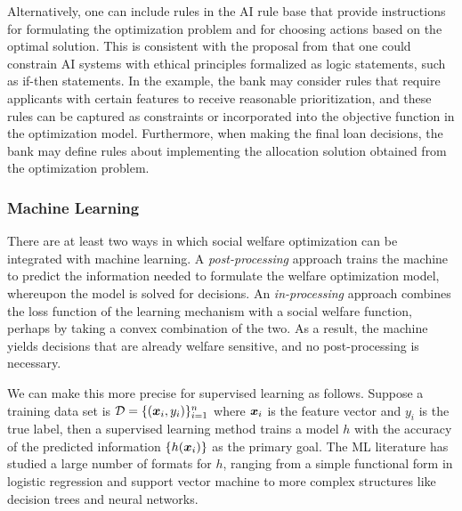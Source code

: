 \documentclass{article}[11pt]
\begin{document}
Alternatively, one can include rules in the AI rule base that provide instructions for formulating the optimization problem and for choosing actions based on the optimal solution. This is consistent with the proposal from \cite{BriArkBel06} that one could constrain AI systems with ethical principles formalized as logic statements, such as if-then statements. In the example, the bank may consider rules that require applicants with certain features to receive reasonable prioritization, and these rules can be captured as constraints or incorporated into the objective function in the optimization model. Furthermore, when making the final loan decisions, the bank may define rules about implementing the allocation solution obtained from the optimization problem. 





\subsubsection*{Machine Learning}
There are at least two ways in which social welfare optimization can be integrated with machine learning.  A \textit{post-processing} approach trains the machine to predict the information needed to formulate the welfare optimization model, whereupon the model is solved for decisions.  An \textit{in-processing} approach combines the loss function of the learning mechanism with a social welfare function, perhaps by taking a convex combination of the two.  As a result, the machine yields decisions that are already welfare sensitive, and no post-processing is necessary.  

We can make this more precise for supervised learning as follows. Suppose a training data set is $\mathcal{D} = \{(\bm{x}_i, y_i) \}_{i = 1}^n$ where $\bm{x}_i$ is the feature vector and $y_i$ is the true label, then a supervised learning method trains a model $h$ with the accuracy of the predicted information $\{h(\bm{x}_i)\}$ as the primary goal. The ML literature has studied a large number of formats for $h$, ranging from a simple functional form in logistic regression and support vector machine to more complex structures like decision trees and neural networks. 
\end{document}
